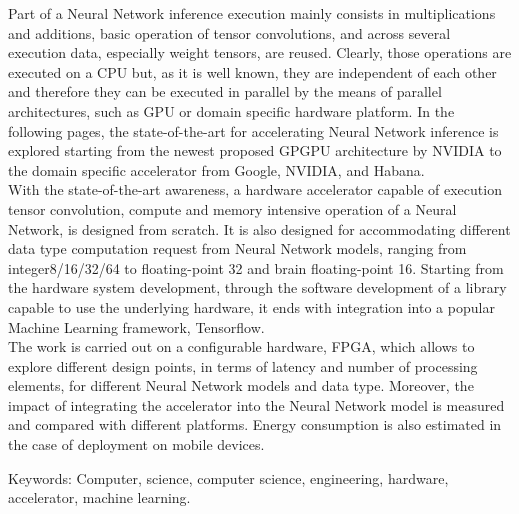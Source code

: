 
Part of a Neural Network inference execution mainly consists in multiplications and additions, basic operation of tensor convolutions, and across several execution data, especially weight tensors, are reused.
Clearly, those operations are executed on a CPU but, as it is well known, they are independent of each other and therefore they can be executed in parallel by the means of parallel architectures, such as GPU or domain specific hardware platform.
In the following pages, the state-of-the-art for accelerating Neural Network inference is explored starting from the newest proposed GPGPU architecture by NVIDIA to the domain specific accelerator from Google, NVIDIA, and Habana.\\
With the state-of-the-art awareness, a hardware accelerator capable of execution tensor convolution,  compute and memory intensive operation of a Neural Network, is designed from scratch. It is also designed for accommodating different data type computation request from Neural Network models, ranging from integer8/16/32/64 to floating-point 32 and brain floating-point 16.
Starting from the hardware system development, through the software development of a library capable to use the underlying hardware, it ends with integration into a popular Machine Learning framework, Tensorflow.\\
The work is carried out on a configurable hardware, FPGA, which allows to explore different design points, in terms of latency and number of processing elements, for different Neural Network models and data type. Moreover, the impact of integrating the accelerator into the Neural Network model is measured and compared with different platforms. Energy consumption is also estimated in the case of deployment on mobile devices.


\vfill
Keywords: Computer, science, computer science, engineering, hardware, accelerator, machine learning.

\newpage				%
\thispagestyle{empty}
\mbox{}